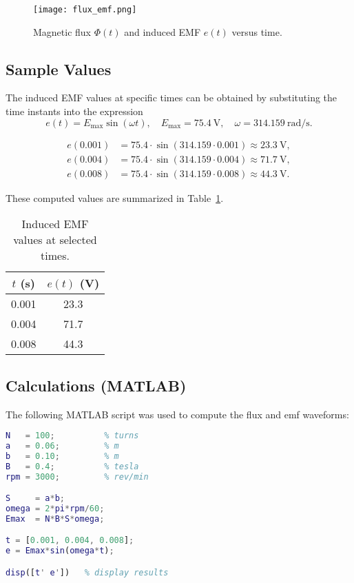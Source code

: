 \documentclass{article}
\begin{document}
\begin{figure}[H]
    \centering
    \texttt{[image: flux\_emf.png]}
    \caption{Magnetic flux $\Phi(t)$ and induced EMF $e(t)$ versus time.}
    \label{fig:flux_emf}
\end{figure}





\subsection{Sample Values} %

The induced EMF values at specific times can be obtained by substituting 
the time instants into the expression
\[
e(t) = E_{\text{max}} \sin(\omega t), \quad
E_{\text{max}} = 75.4~\text{V}, \quad \omega = 314.159~\text{rad/s}.
\]

\begin{align*}
e(0.001) &= 75.4 \cdot \sin(314.159 \cdot 0.001) \approx 23.3~\text{V}, \\
e(0.004) &= 75.4 \cdot \sin(314.159 \cdot 0.004) \approx 71.7~\text{V}, \\
e(0.008) &= 75.4 \cdot \sin(314.159 \cdot 0.008) \approx 44.3~\text{V}.
\end{align*}

These computed values are summarized in Table~\ref{tab:sample_values}.

\begin{table}[h]
\centering
\begin{tabular}{|c|c|}
\hline
$t$ (s) & $e(t)$ (V) \\
\hline
0.001 & 23.3 \\
0.004 & 71.7 \\
0.008 & 44.3 \\
\hline
\end{tabular}
\caption{Induced EMF values at selected times.}
\label{tab:sample_values}
\end{table}




\subsection{Calculations (MATLAB)} %

The following MATLAB script was used to compute the flux and emf
waveforms:

\begin{lstlisting}[language=Matlab]
% Exercise 1 – Variant C
N   = 100;          % turns
a   = 0.06;         % m
b   = 0.10;         % m
B   = 0.4;          % tesla
rpm = 3000;         % rev/min

S     = a*b;                    
omega = 2*pi*rpm/60;             
Emax  = N*B*S*omega;

t = [0.001, 0.004, 0.008];
e = Emax*sin(omega*t);

disp([t' e'])   % display results
\end{lstlisting}
\end{document}
